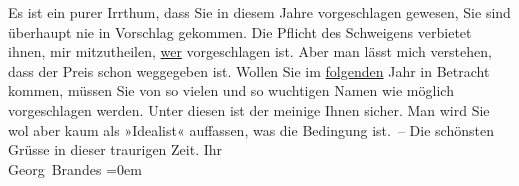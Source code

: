 \begin{ledgroupsized}[t]{13cm}
           \pstart
           Es ist ein purer Irrthum, dass Sie in diesem Jahre vorgeschlagen gewesen, Sie
                    sind überhaupt nie in Vorschlag gekommen. Die Pflicht des Schweigens verbietet
                    ihnen, mir mitzutheilen, \uline{wer} vorgeschlagen ist.
                    Aber man lässt mich verstehen, dass der Preis schon weggegeben ist.\pend
           \pstart
           Wollen Sie im \uline{folgenden} Jahr in Betracht kommen,
                    müssen Sie  von so vielen und so
                    wuchtigen Namen wie möglich vorgeschlagen werden. Unter diesen ist der meinige
                    Ihnen sicher. Man wird Sie wol aber kaum als »Idealist« auffassen, was die
                    Bedingung ist. – Die schönsten Grüsse in dieser traurigen Zeit.\pend
           \pstart
           Ihr{\\[\baselineskip]}\spacefill\mbox{Georg Brandes}\pend
           \leftskip=0em{}\endnumbering{}\end{ledgroupsized}  \newcommand{\dateiname}{L02198}\newcommand{\titel}{Georg Brandes an Arthur Schnitzler, 18. 10. 1914}\newcommand{\editorInnen}{Martin Anton Müller und Gerd-Hermann Susen}
      